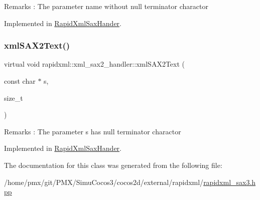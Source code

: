 \begin{DoxyRemark}{Remarks}
\+: The parameter \textquotesingle{}name\textquotesingle{} without null terminator charactor 
\end{DoxyRemark}


Implemented in \hyperlink{classRapidXmlSaxHander_a71e12a4c8a2c5f03b621788d3aeb884c}{Rapid\+Xml\+Sax\+Hander}.

\mbox{\label{classrapidxml_1_1xml__sax2__handler_a184f17acd823b4947f7cd4cfe4e89ae4}} 
\subsubsection{\texorpdfstring{xml\+S\+A\+X2\+Text()}{xmlSAX2Text()}}
{\footnotesize\ttfamily virtual void rapidxml\+::xml\+\_\+sax2\+\_\+handler\+::xml\+S\+A\+X2\+Text (\begin{DoxyParamCaption}\item[{const char $\ast$}]{s,  }\item[{size\+\_\+t}]{ }\end{DoxyParamCaption})\hspace{0.3cm}{\ttfamily [pure virtual]}}

\begin{DoxyRemark}{Remarks}
\+: The parameter \textquotesingle{}s\textquotesingle{} has null terminator charactor 
\end{DoxyRemark}


Implemented in \hyperlink{classRapidXmlSaxHander_af6288a590b26853714182f507c10a66b}{Rapid\+Xml\+Sax\+Hander}.



The documentation for this class was generated from the following file\+:\begin{DoxyCompactItemize}
\item 
/home/pmx/git/\+P\+M\+X/\+Simu\+Cocos3/cocos2d/external/rapidxml/\hyperlink{rapidxml__sax3_8hpp}{rapidxml\+\_\+sax3.\+hpp}\end{DoxyCompactItemize}
